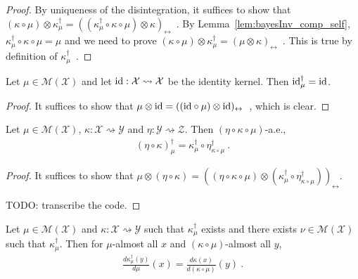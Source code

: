 \begin{proof}\leanok
{}
By uniqueness of the disintegration, it suffices to show that $(\kappa \circ \mu) \otimes \kappa_\mu^\dagger = ((\kappa_\mu^\dagger \circ \kappa \circ \mu) \otimes \kappa)_\leftrightarrow$~.
By Lemma~\ref{lem:bayesInv_comp_self}, $\kappa_\mu^\dagger \circ \kappa \circ \mu = \mu$ and we need to prove $(\kappa \circ \mu) \otimes \kappa_\mu^\dagger = (\mu \otimes \kappa)_\leftrightarrow$~.
This is true by definition of $\kappa_\mu^\dagger$~.
\end{proof}


\begin{lemma}
  \label{lem:bayesInv_id}
  \leanok
  Let $\mu \in \mathcal M (\mathcal X)$ and let $\textup{id} : \mathcal X \rightsquigarrow \mathcal X$ be the identity kernel. Then $\textup{id}_\mu^\dagger = \textup{id}$.
\end{lemma}

\begin{proof}\leanok
{}
It suffices to show that $\mu \otimes \textup{id} = ((\textup{id} \circ \mu) \otimes \textup{id})_\leftrightarrow$~, which is clear.
\end{proof}


\begin{lemma}
  \label{lem:bayesInv_comp}
  \leanok
  Let $\mu \in \mathcal M(\mathcal X)$, $\kappa : \mathcal X \rightsquigarrow \mathcal Y$ and $\eta : \mathcal Y \rightsquigarrow \mathcal Z$. Then $(\eta \circ \kappa \circ \mu)$-a.e.,
  \begin{align*}
  (\eta \circ \kappa)_\mu^\dagger = \kappa_{\mu}^\dagger \circ \eta_{\kappa \circ \mu}^\dagger
  \: .
  \end{align*}
\end{lemma}

\begin{proof}\leanok
{}
It suffices to show that $\mu \otimes (\eta \circ \kappa) = ((\eta \circ \kappa \circ \mu) \otimes (\kappa_{\mu}^\dagger \circ \eta_{\kappa \circ \mu}^\dagger))_\leftrightarrow$.

TODO: transcribe the code.
\end{proof}


\begin{lemma}
  \label{lem:rnDeriv_bayesInv}
  Let $\mu \in \mathcal M(\mathcal X)$ and $\kappa : \mathcal X \rightsquigarrow \mathcal Y$ such that $\kappa_\mu^\dagger$ exists and there exists $\nu \in \mathcal M(\mathcal X)$ such that $\kappa_\mu^\dagger$. Then for $\mu$-almost all $x$ and $(\kappa \circ \mu)$-almost all $y$,
  \begin{align*}
  \frac{d \kappa_\mu^\dagger(y)}{d \mu}(x) = \frac{d \kappa(x)}{d(\kappa \circ \mu)}(y)
  \: .
  \end{align*}
\end{lemma}

